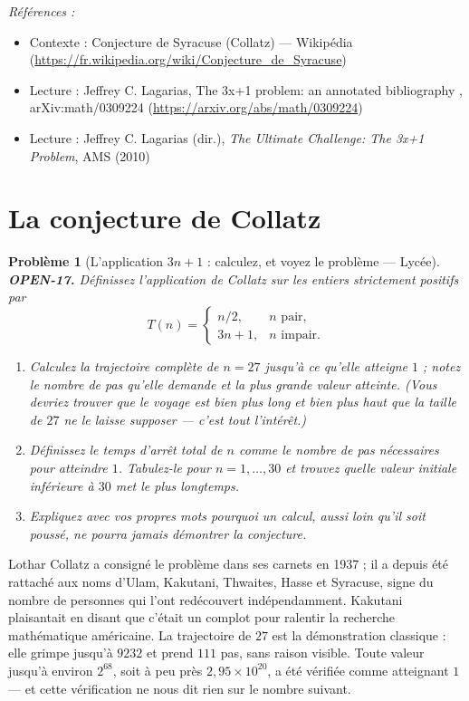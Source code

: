 \documentclass[11pt]{article}
\newtheorem{problem}{Problème}
\newenvironment{refs}{\par\small\noindent\emph{Références :}\begin{itemize}\setlength\itemsep{0pt}}{\end{itemize}\normalsize}
\begin{document}
\begin{refs}
\item Contexte : Conjecture de Syracuse (Collatz) --- Wikipédia (\url{https://fr.wikipedia.org/wiki/Conjecture_de_Syracuse})
\item Lecture : Jeffrey C. Lagarias, \og{} The 3x+1 problem: an annotated bibliography \fg{}, arXiv:math/0309224 (\url{https://arxiv.org/abs/math/0309224})
\item Lecture : Jeffrey C. Lagarias (dir.), \textit{The Ultimate Challenge: The 3x+1 Problem}, AMS (2010)
\end{refs}

\bigskip


\section*{La conjecture de Collatz}

\begin{problem}[{L'application $ 3n+1 $ : calculez, et voyez le problème --- Lycée}]
\textbf{OPEN-17.} Définissez l'application de Collatz sur les entiers strictement
positifs par
\[ T(n) = \begin{cases} n/2, & n \text{ pair},\\ 3n+1, & n \text{ impair}.\end{cases} \]
\begin{enumerate}
\item[(a)] Calculez la trajectoire complète de $ n = 27 $ jusqu'à ce qu'elle atteigne $ 1 $ ;
notez le nombre de pas qu'elle demande et la plus grande valeur atteinte. (Vous devriez
trouver que le voyage est bien plus long et bien plus haut que la taille de $ 27 $ ne le
laisse supposer --- c'est tout l'intérêt.)
\item[(b)] Définissez le \textit{temps d'arrêt total} de $ n $ comme le nombre de pas nécessaires
pour atteindre $ 1 $. Tabulez-le pour $ n = 1, \dots, 30 $ et trouvez quelle valeur
initiale inférieure à $ 30 $ met le plus longtemps.
\item[(c)] Expliquez avec vos propres mots pourquoi un calcul, aussi loin qu'il soit poussé, ne
pourra jamais démontrer la conjecture.
\end{enumerate}

\end{problem}

\noindent Lothar Collatz a consigné le problème dans ses carnets en 1937 ; il a
depuis été rattaché aux noms d'Ulam, Kakutani, Thwaites, Hasse et Syracuse, signe du
nombre de personnes qui l'ont redécouvert indépendamment. Kakutani plaisantait en disant
que c'était un complot pour ralentir la recherche mathématique américaine. La trajectoire
de $ 27 $ est la démonstration classique : elle grimpe jusqu'à $ 9232 $ et prend
$ 111 $ pas, sans raison visible. Toute valeur jusqu'à environ $ 2^{68} $, soit à peu
près $ 2{,}95 \times 10^{20} $, a été vérifiée comme atteignant $ 1 $ --- et cette
vérification ne nous dit rien sur le nombre suivant.
\end{document}
